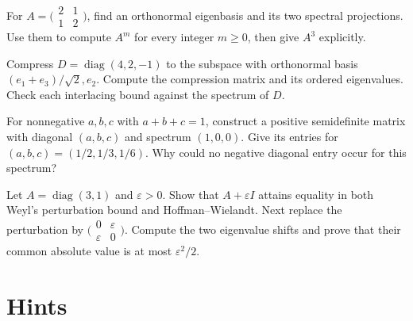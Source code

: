 \begin{exercise}[$\star$]\label{ex:v8c03a}
For $A=\bigl(\begin{smallmatrix}2&1\\1&2\end{smallmatrix}\bigr)$, find an orthonormal eigenbasis and its two spectral projections. Use them to compute $A^m$ for every integer $m\ge0$, then give $A^3$ explicitly.
\end{exercise}
\begin{exercise}[$\star\star$]\label{ex:v8c03b}
Compress $D=\operatorname{diag}(4,2,-1)$ to the subspace with orthonormal basis $(e_1+e_3)/\sqrt2,e_2$. Compute the compression matrix and its ordered eigenvalues. Check each interlacing bound against the spectrum of $D$.
\end{exercise}
\begin{exercise}[$\star$]\label{ex:v8c03c}
For nonnegative $a,b,c$ with $a+b+c=1$, construct a positive semidefinite matrix with diagonal $(a,b,c)$ and spectrum $(1,0,0)$. Give its entries for $(a,b,c)=(1/2,1/3,1/6)$. Why could no negative diagonal entry occur for this spectrum?
\end{exercise}
\begin{exercise}[$\star\star$]\label{ex:v8c03d}
Let $A=\operatorname{diag}(3,1)$ and $\varepsilon>0$. Show that $A+\varepsilon I$ attains equality in both Weyl's perturbation bound and Hoffman--Wielandt. Next replace the perturbation by $\bigl(\begin{smallmatrix}0&\varepsilon\\\varepsilon&0\end{smallmatrix}\bigr)$. Compute the two eigenvalue shifts and prove that their common absolute value is at most $\varepsilon^2/2$.
\end{exercise}

\section{Hints}

